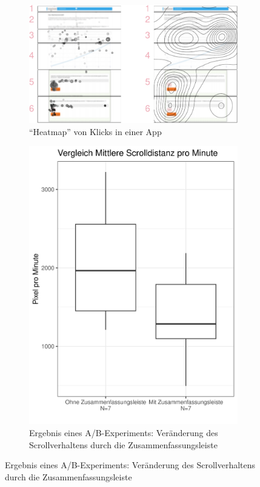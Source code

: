 \documentclass[a0,portrait]{a0poster}
\begin{document}
\begin{multicols}{2}
\begin{figure}[H]
\hfill
\begin{subfigure}[h]{0.6\linewidth}
\includegraphics[width=\linewidth]{figtraj-1}
\caption*{\footnotesize \enquote{Heatmap} von Klicks in einer App}
\end{subfigure}
\hfill
\begin{subfigure}[h]{0.325\linewidth}
\includegraphics[width=\linewidth]{summarypanel_scrolldist_poster}
\caption*{\footnotesize Ergebnis eines A/B-Experiments: Ver\-änd\-erung des Scrollverhaltens durch die Zusammenfassungsleiste}
\end{subfigure}
\hfill
\end{figure}



\end{multicols}
\end{document}
